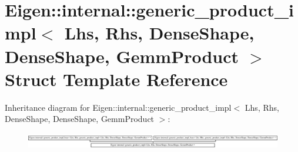 \hypertarget{struct_eigen_1_1internal_1_1generic__product__impl_3_01_lhs_00_01_rhs_00_01_dense_shape_00_01_def53e16cb724bbb32f6918835a9970bd5}{}\section{Eigen\+:\+:internal\+:\+:generic\+\_\+product\+\_\+impl$<$ Lhs, Rhs, Dense\+Shape, Dense\+Shape, Gemm\+Product $>$ Struct Template Reference}
\label{struct_eigen_1_1internal_1_1generic__product__impl_3_01_lhs_00_01_rhs_00_01_dense_shape_00_01_def53e16cb724bbb32f6918835a9970bd5}
Inheritance diagram for Eigen\+:\+:internal\+:\+:generic\+\_\+product\+\_\+impl$<$ Lhs, Rhs, Dense\+Shape, Dense\+Shape, Gemm\+Product $>$\+:\begin{figure}[H]
\begin{center}
\leavevmode
\includegraphics[height=0.708861cm]{struct_eigen_1_1internal_1_1generic__product__impl_3_01_lhs_00_01_rhs_00_01_dense_shape_00_01_def53e16cb724bbb32f6918835a9970bd5}
\end{center}
\end{figure}
